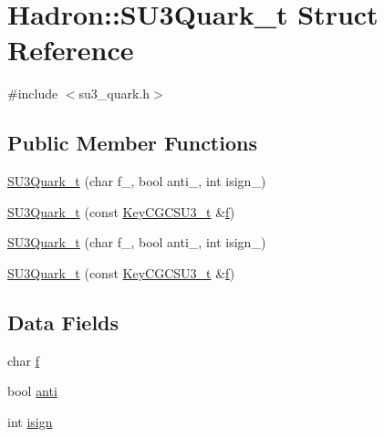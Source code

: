 \hypertarget{structHadron_1_1SU3Quark__t}{}\section{Hadron\+:\+:S\+U3\+Quark\+\_\+t Struct Reference}
\label{structHadron_1_1SU3Quark__t}


{\ttfamily \#include $<$su3\+\_\+quark.\+h$>$}

\subsection*{Public Member Functions}
\begin{DoxyCompactItemize}
\item 
\mbox{\hyperlink{structHadron_1_1SU3Quark__t_a57662fb1a4488e8144f8646e9cc13c2e}{S\+U3\+Quark\+\_\+t}} (char f\+\_\+, bool anti\+\_\+, int isign\+\_\+)
\item 
\mbox{\hyperlink{structHadron_1_1SU3Quark__t_a7d4c72a59b297140813815d95d426e42}{S\+U3\+Quark\+\_\+t}} (const \mbox{\hyperlink{structHadron_1_1KeyCGCSU3__t}{Key\+C\+G\+C\+S\+U3\+\_\+t}} \&\mbox{\hyperlink{structHadron_1_1SU3Quark__t_a3607400b071fe522d2f3e62048affe73}{f}})
\item 
\mbox{\hyperlink{structHadron_1_1SU3Quark__t_a57662fb1a4488e8144f8646e9cc13c2e}{S\+U3\+Quark\+\_\+t}} (char f\+\_\+, bool anti\+\_\+, int isign\+\_\+)
\item 
\mbox{\hyperlink{structHadron_1_1SU3Quark__t_a7d4c72a59b297140813815d95d426e42}{S\+U3\+Quark\+\_\+t}} (const \mbox{\hyperlink{structHadron_1_1KeyCGCSU3__t}{Key\+C\+G\+C\+S\+U3\+\_\+t}} \&\mbox{\hyperlink{structHadron_1_1SU3Quark__t_a3607400b071fe522d2f3e62048affe73}{f}})
\end{DoxyCompactItemize}
\subsection*{Data Fields}
\begin{DoxyCompactItemize}
\item 
char \mbox{\hyperlink{structHadron_1_1SU3Quark__t_a3607400b071fe522d2f3e62048affe73}{f}}
\item 
bool \mbox{\hyperlink{structHadron_1_1SU3Quark__t_a71ef8ea48f01852689482b6e9c5dda0e}{anti}}
\item 
int \mbox{\hyperlink{structHadron_1_1SU3Quark__t_a1ab0d1ef0eb3573f07a0f96012b68fa8}{isign}}
\end{DoxyCompactItemize}


